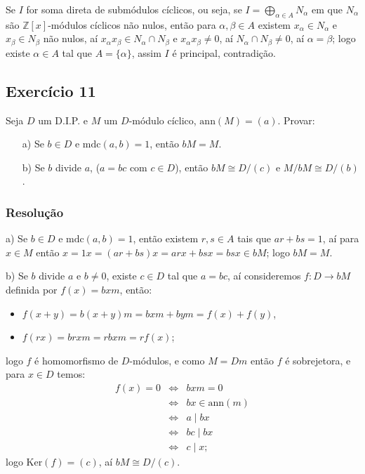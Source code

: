 \documentclass[10pt,a4paper]{article}
\begin{document}
Se $I$ for soma direta de submódulos cíclicos, ou seja, se $I=\bigoplus_{\alpha\in A}N_\alpha$ em que $N_\alpha$ são $\mathbb{Z}[x]$-módulos cíclicos não nulos, então para $\alpha,\beta\in A$ existem $x_\alpha\in N_\alpha$ e $x_\beta\in N_\beta$ não nulos, aí $x_\alpha x_\beta\in N_\alpha\cap N_\beta$ e $x_\alpha x_\beta\neq 0$, aí $N_\alpha\cap N_\beta\neq 0$, aí $\alpha=\beta$; logo existe $\alpha\in A$ tal que $A=\{\alpha\}$, assim $I$ é principal, contradição.

\subsection*{Exercício 11}

Seja $D$ um D.I.P. e $M$ um $D$-módulo cíclico, $\mathrm{ann}(M)=(a)$. Provar:
\begin{itemize}
\item[a)] Se $b\in D$ e $\mathrm{mdc}(a,b)=1$, então $bM=M$.
\item[b)] Se $b$ divide $a$, ($a=bc$ com $c\in D$), então $bM\cong D/(c)$ e $M/bM\cong D/(b)$.
\end{itemize}

\subsubsection*{Resolução}

a) Se $b\in D$ e $\mathrm{mdc}(a,b)=1$, então existem $r,s\in A$ tais que $ar+bs=1$, aí para $x\in M$ então $x=1x=(ar+bs)x=arx+bsx=bsx\in bM$; logo $bM=M$.

\medskip
\noindent
b) Se $b$ divide $a$ e $b\neq 0$, existe $c\in D$ tal que $a=bc$, aí consideremos $f:D\rightarrow bM$ definida por $f(x)=bxm$, então:
\begin{itemize}
\item $f(x+y)=b(x+y)m=bxm+bym=f(x)+f(y)$,
\item $f(rx)=brxm=rbxm=rf(x)$;
\end{itemize}
logo $f$ é homomorfismo de $D$-módulos, e como $M=Dm$ então $f$ é sobrejetora, e para $x\in D$ temos:
\[
\begin{array}{rcl}
f(x)=0&\Leftrightarrow&bxm=0\\&\Leftrightarrow&bx\in\mathrm{ann}(m)\\&\Leftrightarrow&a\mid bx\\&\Leftrightarrow&bc\mid bx\\&\Leftrightarrow&c\mid x;
\end{array}
\]
logo $\mathrm{Ker}(f)=(c)$, aí $bM\cong D/(c)$.
\end{document}
